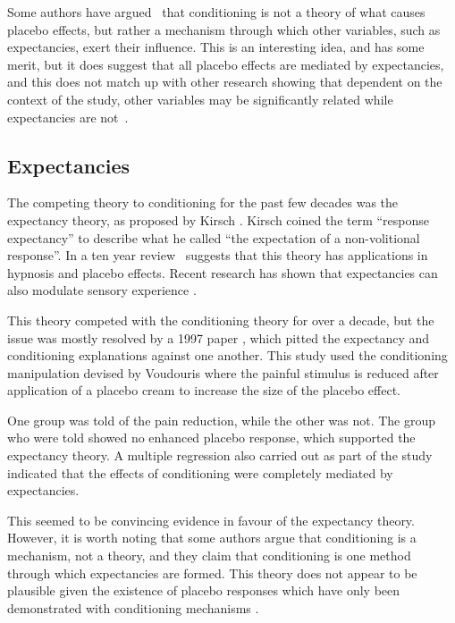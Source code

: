 Some authors have argued~\cite{Stewart-Williams2004b} that conditioning is not a theory of what causes placebo effects, but rather a mechanism through which other variables, such as expectancies, exert their influence. This is an interesting idea, and has some merit, but it does suggest that all placebo effects are mediated by expectancies, and this does not match up with other research showing that dependent on the context of the study, other variables may be significantly related while expectancies are not~\cite{Geers2005a,Hyland2006}.  

\subsection{Expectancies}
\label{sec:expectancies}

The competing theory to conditioning for the past few decades was the expectancy theory, as proposed by Kirsch \cite{Kirsch1985}. Kirsch coined the term ``response expectancy'' to describe what he called ``the expectation of a non-volitional response''. In a ten year review~\cite{Kirsch1997} suggests that this theory has applications in hypnosis and placebo effects. Recent research has shown that expectancies can also modulate sensory experience  \cite{Sterzer2008}. 

This theory competed with the conditioning theory for over a decade, but the issue was mostly resolved by a 1997 paper \cite{Montgomery1997}, which pitted the expectancy and conditioning explanations against one another. This study used the conditioning manipulation devised by Voudouris \cite{Voudouris1985} where the painful stimulus is reduced after application of a placebo cream to increase the size of the placebo effect. 

One group was told of the pain reduction, while the other was not. The group who were told showed no enhanced placebo response, which supported the expectancy theory. A multiple regression also carried out as part of the study indicated that the effects of conditioning were completely mediated by expectancies. 

This seemed to be convincing evidence in favour of the expectancy theory. However, it is worth noting that some authors \cite{Stewart-Williams2004a}  argue that conditioning is a mechanism, not a theory, and they claim that conditioning is one method through which expectancies are formed. This theory does not appear to be plausible given the existence of placebo responses which have only been demonstrated with conditioning mechanisms \cite{benedetti2003a}.   

